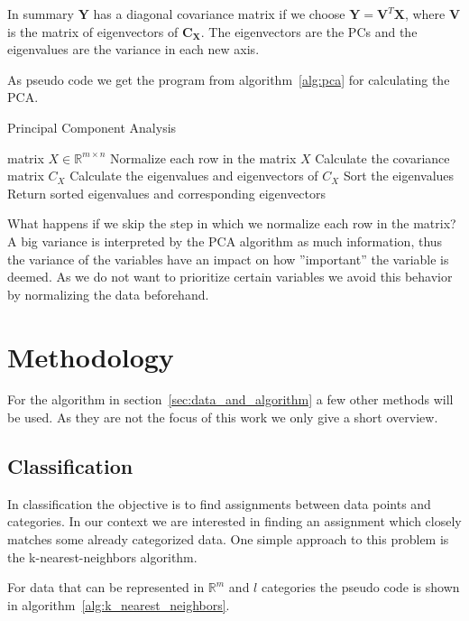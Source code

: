 \documentclass[a4paper]{IEEEtran}
\begin{document}
In summary $\mathbf{Y}$ has a diagonal covariance matrix if we choose $\mathbf{Y} = \mathbf{V}^T\mathbf{X}$, where $\mathbf{V}$ is the matrix of eigenvectors of $\mathbf{C}_\mathbf{X}$. The eigenvectors are the PCs and the eigenvalues are the variance in each new axis.

As pseudo code we get the program from algorithm~\ref{alg:pca} for calculating the PCA.

\begin{algorithm}
	\caption{Principal Component Analysis}\label{alg:pca}
	\begin{algorithmic}
		\Require matrix $X \in \mathbb{R}^{m\times n}$
		\State Normalize each row in the matrix $X$
		\State Calculate the covariance matrix $C_{X}$
		\State Calculate the eigenvalues and eigenvectors of $C_{X}$
		\State Sort the eigenvalues
		\State Return sorted eigenvalues and corresponding eigenvectors
	\end{algorithmic}
\end{algorithm}

What happens if we skip the step in which we normalize each row in the matrix? A big variance is interpreted by the PCA algorithm as much information, thus the variance of the variables have an impact on how ''important'' the variable is deemed. As we do not want to prioritize certain variables we avoid this behavior by normalizing the data beforehand.

\section{Methodology}
\label{sec:methodology}

For the algorithm in section~\ref{sec:data_and_algorithm} a few other methods will be used. As they are not the focus of this work we only give a short overview.

\subsection{Classification}
\label{subsec:classification}

In classification the objective is to find assignments between data points and categories. In our context we are interested in finding an assignment which closely matches some already categorized data. One simple approach to this problem is the k-nearest-neighbors algorithm.

For data that can be represented in $\mathbb{R}^m$ and $l$ categories the pseudo code is shown in algorithm~\ref{alg:k_nearest_neighbors}.
\end{document}
